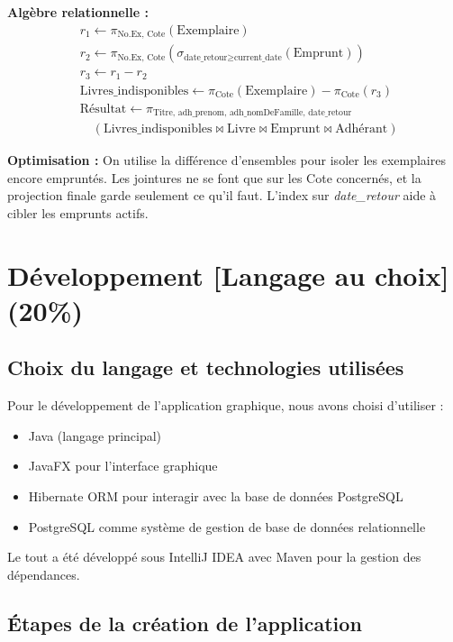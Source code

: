 \documentclass[12pt]{article}
\begin{document}
\textbf{Algèbre relationnelle :}
\[
\begin{aligned}
  &r_1 \leftarrow \pi_{\text{No.Ex, Cote}}(\text{Exemplaire}) \\
  &r_2 \leftarrow \pi_{\text{No.Ex, Cote}} (\sigma_{\text{date\_retour} \geq \text{current\_date}} (\text{Emprunt})) \\
  &r_3 \leftarrow r_1 - r_2 \\
  &\text{Livres\_indisponibles} \leftarrow \pi_{\text{Cote}} (\text{Exemplaire}) - \pi_{\text{Cote}} (r_3) \\
  &\text{Résultat} \leftarrow \pi_{\text{Titre, adh\_prenom, adh\_nomDeFamille, date\_retour}} \\
  &\quad (\text{Livres\_indisponibles} \bowtie \text{Livre} \bowtie \text{Emprunt} \bowtie \text{Adhérant})
\end{aligned}
\]

\textbf{Optimisation :}  
On utilise la différence d’ensembles pour isoler les exemplaires encore empruntés.
Les jointures ne se font que sur les Cote concernés, et la projection finale garde seulement ce qu’il faut.
L’index sur \textit{date\_retour} aide à cibler les emprunts actifs.

\section{Développement [Langage au choix] (20\%)}

\subsection{Choix du langage et technologies utilisées}

Pour le développement de l'application graphique, nous avons choisi d'utiliser :

\begin{itemize}
    \item Java (langage principal)
    \item JavaFX pour l'interface graphique
    \item Hibernate ORM pour interagir avec la base de données PostgreSQL
    \item PostgreSQL comme système de gestion de base de données relationnelle
\end{itemize}

Le tout a été développé sous IntelliJ IDEA avec Maven pour la gestion des dépendances.

\subsection{Étapes de la création de l'application}
\end{document}

